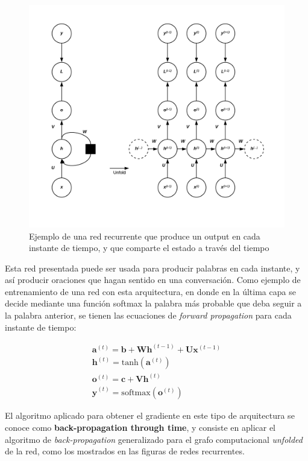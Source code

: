 \begin{figure}[H]
\captionsetup{font=small,labelfont=small}
\caption{Ejemplo de una red recurrente que produce un output en cada instante de tiempo, y que comparte el estado a trav\'es del tiempo}
\centering
\includegraphics[scale=.5]{img/RNN2.png}
\end{figure}

Esta red presentada puede ser usada para producir palabras en cada instante, y as\'i producir oraciones que hagan sentido en una conversaci\'on. Como ejemplo de entrenamiento de una red con esta arquitectura, en donde en la \'ultima capa se decide mediante una funci\'on softmax la palabra m\'as probable que deba seguir a la palabra anterior, se tienen las ecuaciones de \textit{forward propagation} para cada instante de tiempo:

\begin{equation}
\begin{array}{l}
\bm{a}^{(t)} = \bm{b} + \bm{W}\bm{h}^{(t-1)}+\bm{U}\bm{x}^{(t-1)} \\
\bm{h}^{(t)} = \textrm{tanh}(\bm{a}^{(t)}) \\
\bm{o}^{(t)} = \bm{c} + \bm{V}\bm{h}^{(t)} \\
\hat{\bm{y}}^{(t)} = \textrm{softmax}(\bm{o}^{(t)})
\end{array}
\end{equation}

El algoritmo aplicado para obtener el gradiente en este tipo de arquitectura se conoce como \textbf{back-propagation through time}, y consiste en aplicar el algoritmo de \textit{back-propagation} generalizado para el grafo computacional \textit{unfolded} de la red, como los mostrados en las figuras de redes recurrentes.

